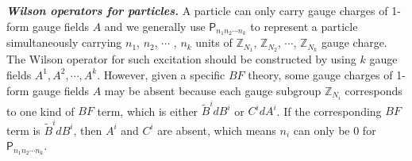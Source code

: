 \documentclass[11pt,nofootinbib,preprint]{revtex4-1}
\begin{document}

\textbf{\textit{Wilson operators for particles.}} 
 A particle can only carry gauge charges of 1-form gauge fields $A$ and we generally use $\mathsf{P}_{n_{1}n_{2}\cdots n_{k}}$ to represent a particle simultaneously carrying $n_{1}$, $n_{2}$, $\cdots$ , $n_{k}$ units of $\mathbb{Z} _{N_1}$, $\mathbb{Z} _{N_2}$, $\cdots$, $\mathbb{Z} _{N_k}$ gauge charge. The Wilson operator for such excitation should be constructed by using $k$ gauge fields ${A^1, A^2, \cdots, A^k}$. However, given a specific $BF$ theory, some gauge charges of 1-form gauge fields $A$ may be absent because each gauge subgroup $\mathbb{Z} _{N_i}$ corresponds to one kind of $BF$ term, which is either $\tilde{B}^idB^i$ or $C^idA^i$. If the corresponding $BF$ term is $\tilde{B}^idB^i$, then $A^i$ and $C^i$ are absent, which means $n_i$ can only be 0 for $\mathsf{P}_{n_{1}n_{2}\cdots n_{k}}$.
 
\end{document}
